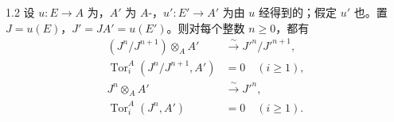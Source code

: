 \begin{SGAresult}{}{1.2}
设 $u:E\to A$ 为，$A'$ 为 $A$-，$u':E'\to A'$ 为由 $u$ 经得到的；假定 $u'$ 也。置 $J=u(E)$，$J'=JA'=u(E')$。则对每个整数 $n\geq0$，都有
\begin{align}
 (J^n/J^{n+1})\otimes_A A'&\xrightarrow{\sim}J'^n/J'^{n+1},\tag{1.2.1}\\
 \operatorname{Tor}_i^A(J^n/J^{n+1},A')&=0\quad(i\geq1),\tag{1.2.2}\\
 J^n\otimes_A A'&\xrightarrow{\sim}J'^n,\tag{1.2.3}\\
 \operatorname{Tor}_i^A(J^n,A')&=0\quad(i\geq1).\tag{1.2.4}
\end{align}
\end{SGAresult}
